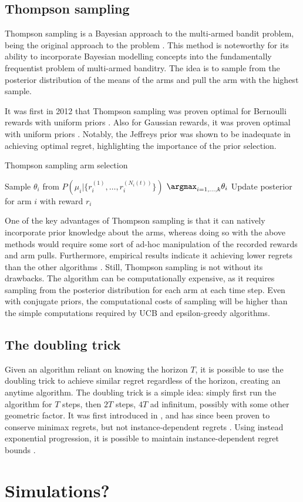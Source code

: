\subsection{Thompson sampling}
Thompson sampling is a Bayesian approach to the multi-armed bandit problem, being the original approach to the problem \cite{thompson1933}.
This method is noteworthy for its ability to incorporate Bayesian modelling concepts into the fundamentally frequentist problem of multi-armed banditry.
The idea is to sample from the posterior distribution of the means of the arms and pull the arm with the highest sample.

It was first in 2012 that Thompson sampling was proven optimal for Bernoulli rewards with uniform priors \cite{kaufmann2012}.
Also for Gaussian rewards, it was proven optimal with uniform priors \cite{honda2014}.
Notably, the Jeffreys prior was shown to be inadequate in achieving optimal regret, highlighting the importance of the prior selection.

\begin{algorithm}
    \caption{Thompson sampling arm selection}
    \label{alg:thompson}
    \begin{algorithmic}
        \State Sample $\theta_i$ from $P(\mu_i | \{r_i^{(1)}, \dots, r_i^{(N_i(t))}\})$
        \EndFor
        \State \Return $\argmax_{i=1,\dots,k} \theta_i$
        \State Update posterior for arm $i$ with reward $r_i$
    \end{algorithmic}
\end{algorithm}

One of the key advantages of Thompson sampling is that it can natively incorporate prior knowledge about the arms, whereas doing so with the above methods would require some sort of ad-hoc manipulation of the recorded rewards and arm pulls.
Furthermore, empirical results indicate it achieving lower regrets than the other algorithms \cite{kaufmann2012}.
Still, Thompson sampling is not without its drawbacks.
The algorithm can be computationally expensive, as it requires sampling from the posterior distribution for each arm at each time step.
Even with conjugate priors, the computational costs of sampling will be higher than the simple computations required by UCB and epsilon-greedy algorithms.

\subsection{The doubling trick}
Given an algorithm reliant on knowing the horizon $T$, it is possible to use the doubling trick to achieve similar regret regardless of the horizon, creating an anytime algorithm.
The doubling trick is a simple idea: simply first run the algorithm for $T$ steps, then $2T$ steps, $4T$ ad infinitum, possibly with some other geometric factor.
It was first introduced in \cite{auer1995}, and has since been proven to conserve minimax regrets, but not instance-dependent regrets \cite{besson2018}.
Using instead exponential progression, it is possible to maintain instance-dependent regret bounds \cite{besson2018}.

\section{Simulations?}